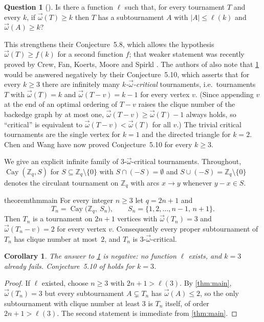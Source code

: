 \documentclass[11pt,a4paper]{article}
\theoremstyle{plain}
\newtheorem{corollary}[theorem]{Corollary}
\theoremstyle{definition}
\newtheorem{question}[theorem]{Question}
\theoremstyle{remark}
\newcommand{\cl}{\overrightarrow{\omega}}
\newcommand{\Z}{\mathbb Z}
\newcommand{\Cay}{\operatorname{Cay}}
\begin{document}
\begin{question}[{\cite[Question~5.9]{AACL23}}]\label{q:59}
Is there a function $\ell$ such that, for every tournament $T$ and every $k$, if $\cl(T)\ge k$ then $T$ has a subtournament $A$ with $|A|\le\ell(k)$ and $\cl(A)\ge k$?
\end{question}

This strengthens their Conjecture~5.8, which allows the hypothesis $\cl(T)\ge f(k)$ for a second function $f$; that weaker statement was recently proved by Crew, Fan, Koerts, Moore and Spirkl \cite[Corollary~7]{CFKMS26}. The authors of \cite{AACL23} also note that \cref{q:59} would be answered negatively by their Conjecture~5.10, which asserts that for every $k\ge3$ there are infinitely many \emph{$k$-$\cl$-critical} tournaments, i.e.\ tournaments $T$ with $\cl(T)=k$ and $\cl(T-v)=k-1$ for every vertex $v$. (Since appending $v$ at the end of an optimal ordering of $T-v$ raises the clique number of the backedge graph by at most one, $\cl(T-v)\ge\cl(T)-1$ always holds, so ``critical'' is equivalent to $\cl(T-v)<\cl(T)$ for all $v$.) The trivial critical tournaments are the single vertex for $k=1$ and the directed triangle for $k=2$. Chen and Wang \cite[Theorem~1.1]{CW26} have now proved Conjecture~5.10 for every $k\ge3$.

We give an explicit infinite family of $3$-$\cl$-critical tournaments. Throughout, $\Cay(\Z_q,S)$ for $S\subseteq\Z_q\setminus\{0\}$ with $S\cap(-S)=\emptyset$ and $S\cup(-S)=\Z_q\setminus\{0\}$ denotes the circulant tournament on $\Z_q$ with arcs $x\to y$ whenever $y-x\in S$.

\begin{restatable}{theorem}{thmmain}\label{thm:main}
For every integer $n\ge3$ let $q=2n+1$ and
\[
 T_n=\Cay\bigl(\Z_{q},\ S_n\bigr),\qquad S_n=\{1,2,\dots,n-1,\,n+1\}.
\]
Then $T_n$ is a tournament on $2n+1$ vertices with $\cl(T_n)=3$ and $\cl(T_n-v)=2$ for every vertex $v$. Consequently every proper subtournament of $T_n$ has clique number at most~$2$, and $T_n$ is $3$-$\cl$-critical.
\end{restatable}

\begin{corollary}\label{cor:59}
The answer to \cref{q:59} is negative: no function $\ell$ exists, and $k=3$ already fails. Conjecture~5.10 of \cite{AACL23} holds for $k=3$.
\end{corollary}
\begin{proof}
If $\ell$ existed, choose $n\ge3$ with $2n+1>\ell(3)$. By \cref{thm:main}, $\cl(T_n)=3$ but every subtournament $A\subsetneq T_n$ has $\cl(A)\le2$, so the only subtournament with clique number at least $3$ is $T_n$ itself, of order $2n+1>\ell(3)$. The second statement is immediate from \cref{thm:main}.
\end{proof}
\end{document}
